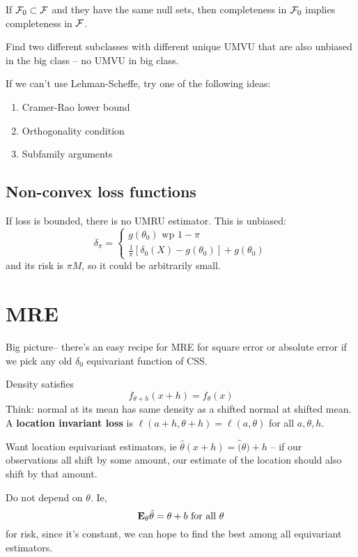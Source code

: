 \documentclass{article}
\begin{document}
\begin{fact}
If $\mathcal F_0 \subset \mathcal F$ and they have the same null sets, then completeness in $\mathcal F_0$ implies completeness in $\mathcal F$. 
\end{fact}
\begin{recipe}
Find two different subclasses with different unique UMVU that are also unbiased in the big class -- no UMVU in big class.	
\end{recipe}
If we can't use Lehman-Scheffe, try one of the following ideas:
\begin{enumerate}
	\item Cramer-Rao lower bound
	\item Orthogonality condition
	\item Subfamily arguments
\end{enumerate}
\subsection{Non-convex loss functions}
If loss is bounded, there is no UMRU estimator. This is unbiased:
$$\delta_\pi = \begin{cases}
	g(\theta_0) \text{ wp } 1-\pi\\
	\frac 1 \pi [\delta_0 (X) - g(\theta_0)] + g(\theta_0)
\end{cases}$$
and its risk is $\pi M$, so it could be arbitrarily small.



\section{MRE}
Big picture-- there's an easy recipe for MRE for square error or absolute error if we pick any old $\delta_0$ equivariant function of CSS. 

\begin{definition}
Density satisfies
$$f_{\theta + h} (x+h) = f_\theta(x)$$
Think: normal at its mean has same density as a shifted normal at shifted mean.\\ 
A \textbf{location invariant loss} is $\ell(a + h,\theta + h ) = \ell(a,\theta)$ for all $a, \theta, h$. 
\end{definition}
Want location equivariant estimators, ie $\hat \theta(x + h) = \hat(\theta) + h$ -- if our observations all shift by some amount, our estimate of the location should also shift by that amount. 

\begin{fact}
Do not depend on $\theta$. Ie, 
$$\mathbf{E}_\theta \hat \theta = \theta + b \text{ for all } \theta $$
for risk, since it's constant, we can hope to find the best among all equivariant estimators.
\end{fact}
\end{document}

